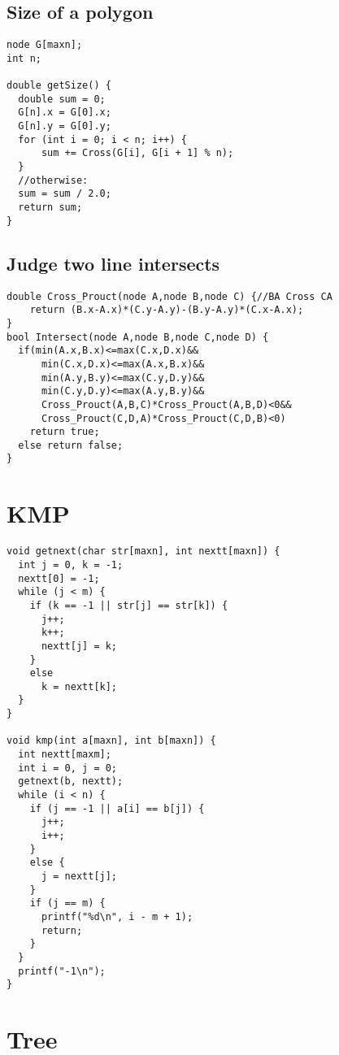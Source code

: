 \documentclass[11pt, a5paper, UTF8]{article}
\begin{document}
\subsection{Size of a polygon}
\begin{lstlisting}
node G[maxn];  
int n;

double getSize() {  
  double sum = 0;  
  G[n].x = G[0].x;  
  G[n].y = G[0].y;  
  for (int i = 0; i < n; i++) {   
      sum += Cross(G[i], G[i + 1] % n);  
  }
  //otherwise:
  sum = sum / 2.0;  
  return sum;
}
\end{lstlisting}
\subsection{Judge two line intersects}
\begin{lstlisting}
double Cross_Prouct(node A,node B,node C) {//BA Cross CA
    return (B.x-A.x)*(C.y-A.y)-(B.y-A.y)*(C.x-A.x);      
}      
bool Intersect(node A,node B,node C,node D) { 
  if(min(A.x,B.x)<=max(C.x,D.x)&&     
      min(C.x,D.x)<=max(A.x,B.x)&&      
      min(A.y,B.y)<=max(C.y,D.y)&&      
      min(C.y,D.y)<=max(A.y,B.y)&&      
      Cross_Prouct(A,B,C)*Cross_Prouct(A,B,D)<0&&      
      Cross_Prouct(C,D,A)*Cross_Prouct(C,D,B)<0)      
    return true;      
  else return false;      
}    
\end{lstlisting}

\section{KMP}
\begin{lstlisting}
void getnext(char str[maxn], int nextt[maxn]) {
  int j = 0, k = -1;
  nextt[0] = -1;
  while (j < m) {
    if (k == -1 || str[j] == str[k]) {
      j++;
      k++;
      nextt[j] = k;
    }
    else
      k = nextt[k];
  }
}

void kmp(int a[maxn], int b[maxn]) {  
  int nextt[maxm];  
  int i = 0, j = 0;  
  getnext(b, nextt);  
  while (i < n) {  
    if (j == -1 || a[i] == b[j]) {  
      j++;  
      i++;  
    }  
    else {
      j = nextt[j];  
    }  
    if (j == m) {  
      printf("%d\n", i - m + 1);  
      return;  
    }  
  }  
  printf("-1\n");
}  
\end{lstlisting}

\section{Tree}
\end{document}
